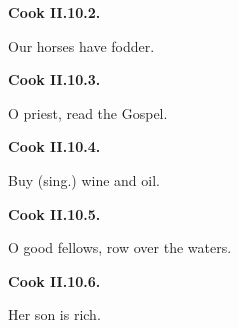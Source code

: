 \par\begin{minipage}{\linewidth}\raggedright
\textbf{Cook II.10.2.}

Our horses have fodder.

\end{minipage}\par\addvspace{4pt}

\par\begin{minipage}{\linewidth}\raggedright
\textbf{Cook II.10.3.}

O priest, read the Gospel.

\end{minipage}\par\addvspace{4pt}

\par\begin{minipage}{\linewidth}\raggedright
\textbf{Cook II.10.4.}

Buy (sing.) wine and oil.

\end{minipage}\par\addvspace{4pt}

\par\begin{minipage}{\linewidth}\raggedright
\textbf{Cook II.10.5.}

O good fellows, row over the waters.

\end{minipage}\par\addvspace{4pt}

\par\begin{minipage}{\linewidth}\raggedright
\textbf{Cook II.10.6.}

Her son is rich.

\end{minipage}\par\addvspace{4pt}

